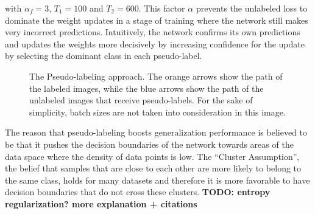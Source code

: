 \noindent with $\alpha_f = 3$, $T_1 = 100$ and $T_2 = 600$. This factor $\alpha$ prevents the unlabeled loss to dominate the weight updates in a stage of training where the network still makes very incorrect predictions. Intuitively, the network confirms its own predictions and updates the weights more decisively by increasing confidence for the update by selecting the dominant class in each pseudo-label.\\

\begin {figure}[!ht]
	\begin{center}
		\scalebox{0.45}{}
	\end{center}

		\caption[Pseudo-Labeling.]{The Pseudo-labeling approach. The orange arrows show the path of the labeled images, while the blue arrows show the path of the unlabeled images that receive pseudo-labels. For the sake of simplicity, batch sizes are not taken into consideration in this image.}
		\label{fig:pseudo_label}
\end {figure}

The reason that pseudo-labeling boosts generalization performance is believed to be that it pushes the decision boundaries of the network towards areas of the data space where the density of data points is low. The ``Cluster Assumption'', the belief that samples that are close to each other are more likely to belong to the same class, holds for many datasets and therefore it is more favorable to have decision boundaries that do not cross these clusters. \textbf{TODO: entropy regularization? more explanation + citations}